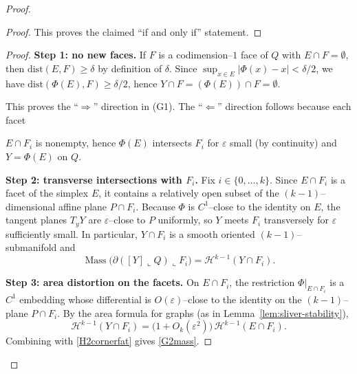 \documentclass[11pt]{article}
\numberwithin{equation}{section}  %
\theoremstyle{plain}
\theoremstyle{definition}
\theoremstyle{remark}
\DeclareMathOperator{\Mass}{Mass}
\newcommand{\dist}{\mathrm{dist}}
\begin{document}
\begin{proof}
\begin{proof}
This proves the claimed ``if and only if'' statement.

\end{proof}

























\begin{proof}

\textbf{Step 1: no new faces.}
If $F$ is a codimension--$1$ face of $Q$ with $E\cap F=\emptyset$, then $\dist(E,F)\ge\delta$ by definition of $\delta$.
Since $\sup_{x\in E}|\Phi(x)-x|<\delta/2$, we have $\dist(\Phi(E),F)\ge\delta/2$, hence $Y\cap F=(\Phi(E))\cap F=\emptyset$.


This proves the ``$\Rightarrow$'' direction in \textup{(G1)}. The ``$\Leftarrow$'' direction follows because each facet

$E\cap F_i$ is nonempty, hence $\Phi(E)$ intersects $F_i$ for $\varepsilon$ small (by continuity) and $Y=\Phi(E)$ on $Q$.

\textbf{Step 2: transverse intersections with $F_i$.}
Fix $i\in\{0,\dots,k\}$.  Since $E\cap F_i$ is a facet of the simplex $E$, it contains a relatively open subset of the
$(k-1)$--dimensional affine plane $P\cap F_i$.  Because $\Phi$ is $C^1$--close to the identity on $E$,
the tangent planes $T_yY$ are $\varepsilon$--close to $P$ uniformly, so $Y$ meets $F_i$ transversely for $\varepsilon$ sufficiently small.
In particular, $Y\cap F_i$ is a smooth oriented $(k-1)$--submanifold and
\[
\Mass\bigl(\partial([Y]\llcorner Q)\llcorner F_i\bigr)=\mathcal H^{k-1}(Y\cap F_i).
\]

\textbf{Step 3: area distortion on the facets.}
On $E\cap F_i$, the restriction $\Phi|_{E\cap F_i}$ is a $C^1$ embedding whose differential is $O(\varepsilon)$--close to the identity
on the $(k-1)$--plane $P\cap F_i$.  By the area formula for graphs (as in Lemma~\ref{lem:sliver-stability}),
\[
\mathcal H^{k-1}(Y\cap F_i)=\bigl(1+O_k(\varepsilon^2)\bigr)\,\mathcal H^{k-1}(E\cap F_i).
\]
Combining with \eqref{H2cornerfat} gives \eqref{G2mass}.

\end{proof}



\end{proof}
\end{document}
